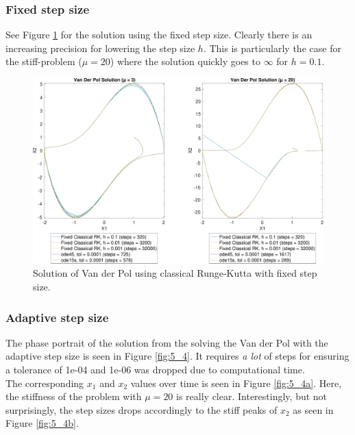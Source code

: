 \subsubsection*{Fixed step size}
See Figure \ref{fig:5_4fix} for the solution using the fixed step size. Clearly there is an increasing precision for lowering the step size $h$. This is particularly the case for the stiff-problem ($\mu = 20$) where the solution quickly goes to $\infty$ for $h=0.1$.

\begin{figure}[htb]
    \centering
    \includegraphics[width=\textwidth]{plots/5_4fix_a.pdf}
    \caption{Solution of Van der Pol using classical Runge-Kutta with fixed step size.}
    \label{fig:5_4fix}
\end{figure}







\subsubsection*{Adaptive step size}
The phase portrait of the solution from the solving the Van der Pol with the adaptive step size is seen in Figure \ref{fig:5_4}. It requires \textit{a lot} of steps for ensuring a tolerance of 1e-04 and 1e-06 was dropped due to computational time.\\

The corresponding $x_1$ and $x_2$ values over time is seen in Figure \ref{fig:5_4a}. Here, the stiffness of the problem with $\mu = 20$ is really clear. Interestingly, but not surprisingly, the step sizes drops accordingly to the stiff peaks of $x_2$ as seen in Figure \ref{fig:5_4b}.

